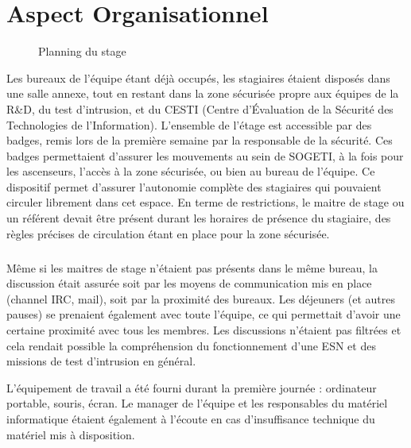 \section*{Aspect Organisationnel}
\begin{figure}[h]
\begin{center}
    \newline
    \caption{Planning du stage}
\end{center}
\end{figure}

Les bureaux de l'équipe étant déjà occupés, les stagiaires étaient disposés dans une salle annexe, tout en restant dans la zone sécurisée propre aux équipes de
la R\&D, du test d'intrusion, et du CESTI (Centre d'Évaluation de la Sécurité des Technologies de l'Information). L'ensemble de l'étage est accessible par des badges, remis lors de la première semaine par la responsable de la
sécurité. Ces badges permettaient d'assurer les mouvements au sein de SOGETI, à la fois pour les ascenseurs, l'accès à la zone sécurisée, ou bien au bureau
de l'équipe. Ce dispositif permet d'assurer l'autonomie complète des stagiaires qui pouvaient circuler librement dans cet espace. En terme de restrictions,
le maitre de stage ou un référent devait être présent durant les horaires de présence du stagiaire, des règles précises de circulation étant en place pour la zone sécurisée.

\subparagraph{}
Même si les maitres de stage n'étaient pas présents dans le même bureau, la discussion était assurée soit par les moyens de communication mis en
place (channel IRC, mail), soit par la proximité des bureaux. Les déjeuners (et autres pauses) se prenaient également avec toute l'équipe, ce qui permettait
d'avoir une certaine proximité avec tous les membres. Les discussions n'étaient pas filtrées et cela rendait possible la compréhension du fonctionnement d'une
ESN et des missions de test d'intrusion en général.

L'équipement de travail a été fourni durant la première journée : ordinateur portable, souris, écran. Le manager de l'équipe et les responsables du matériel
informatique étaient également à l'écoute en cas d'insuffisance technique du matériel mis à disposition.


